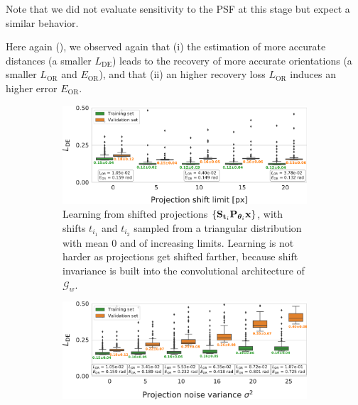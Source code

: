 Note that we did not evaluate sensitivity to the PSF at this stage but expect a similar behavior.

Here again (), we observed again  that (i) the estimation of more accurate distances (a smaller $L_\text{DE}$) leads to the recovery of more accurate orientations (a smaller $L_\text{OR}$ and $E_\text{OR}$), and that (ii) an higher recovery loss $L_\text{OR}$ induces an higher error $E_\text{OR}$.

\begin{figure}[ht!]
    \centering
    \begin{subfigure}[t]{0.47\linewidth}
        \includegraphics[width=\linewidth]{figures/de_translation_nums}
        \caption{%
            Learning from shifted projections $\{ \mathbf{S}_{\mathbf{t}_i} \mathbf{P}_{{\boldsymbol{\theta}}_i} \mathbf{x} \}$, with shifts $t_{i_1}$ and $t_{i_2}$ sampled from a triangular distribution with mean 0 and of increasing limits.
            Learning is not harder as projections get shifted farther, because shift invariance is built into the convolutional architecture of $\mathcal{G}_w$.
    }\label{fig:results:distance-estimation:shift}
    \end{subfigure}
    \hfill
    \begin{subfigure}[t]{0.47\linewidth}
        \includegraphics[width=\linewidth]{figures/de_noises_nums}

\end{subfigure}
\end{figure}
